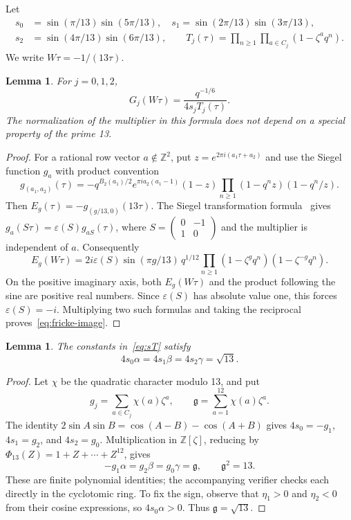 \documentclass[11pt]{amsart}
\newtheorem{lemma}[theorem]{Lemma}
\theoremstyle{remark}
\newcommand{\ZZ}{\mathbb Z}
\begin{document}
Let
\begin{equation}\label{eq:sT}
 \begin{split}
 s_0&=\sin(\pi/13)\sin(5\pi/13),\quad
 s_1=\sin(2\pi/13)\sin(3\pi/13),\\
 s_2&=\sin(4\pi/13)\sin(6\pi/13),\qquad
 T_j(\tau)=\prod_{n\ge1}\prod_{a\in C_j}(1-\zeta^a q^n).
 \end{split}
\end{equation}
We write $W\tau=-1/(13\tau)$.

\begin{lemma}\label{lem:fricke-image}
For $j=0,1,2$,
\begin{equation}\label{eq:fricke-image}
 G_j(W\tau)=\frac{q^{-1/6}}{4s_jT_j(\tau)}.
\end{equation}
The normalization of the multiplier in this formula does not depend on a special property of the prime 13.
\end{lemma}
\begin{proof}
For a rational row vector $a\notin\ZZ^2$, put $z=e^{2\pi i(a_1\tau+a_2)}$ and use the Siegel function $g_a$ with product convention
\[
 g_{(a_1,a_2)}(\tau)
 =-q^{B_2(a_1)/2}e^{\pi i a_2(a_1-1)}(1-z)
 \prod_{n\ge1}(1-q^nz)(1-q^n/z).
\]
Then $E_g(\tau)=-g_{(g/13,0)}(13\tau)$. The Siegel transformation formula~\cite{KL} gives
$g_a(S\tau)=\varepsilon(S)g_{aS}(\tau)$, where
$S=\left(\begin{smallmatrix}0&-1\\1&0\end{smallmatrix}\right)$ and the multiplier is independent of $a$. Consequently
\[
 E_g(W\tau)=2i\varepsilon(S)\sin(\pi g/13)\,
 q^{1/12}\prod_{n\ge1}(1-\zeta^gq^n)(1-\zeta^{-g}q^n).
\]
On the positive imaginary axis, both $E_g(W\tau)$ and the product following the sine are positive real numbers. Since $\varepsilon(S)$ has absolute value one, this forces $\varepsilon(S)=-i$. Multiplying two such formulas and taking the reciprocal proves~\eqref{eq:fricke-image}.
\end{proof}

\begin{lemma}\label{lem:gauss}
The constants in~\eqref{eq:sT} satisfy
\begin{equation}\label{eq:gauss}
 4s_0\alpha=4s_1\beta=4s_2\gamma=\sqrt{13}.
\end{equation}
\end{lemma}
\begin{proof}
Let $\chi$ be the quadratic character modulo 13, and put
\[
 g_j=\sum_{a\in C_j}\chi(a)\zeta^a,\qquad
 \mathfrak g=\sum_{a=1}^{12}\chi(a)\zeta^a.
\]
The identity $2\sin A\sin B=\cos(A-B)-\cos(A+B)$ gives
$4s_0=-g_1$, $4s_1=g_2$, and $4s_2=g_0$.
Multiplication in $\ZZ[\zeta]$, reducing by
$\Phi_{13}(Z)=1+Z+\cdots+Z^{12}$, gives
\[
 -g_1\alpha=g_2\beta=g_0\gamma=\mathfrak g,
 \qquad \mathfrak g^2=13.
\]
These are finite polynomial identities; the accompanying verifier checks each directly in the cyclotomic ring. To fix the sign, observe that $\eta_1>0$ and $\eta_2<0$ from their cosine expressions, so $4s_0\alpha>0$. Thus $\mathfrak g=\sqrt{13}$.
\end{proof}
\end{document}
